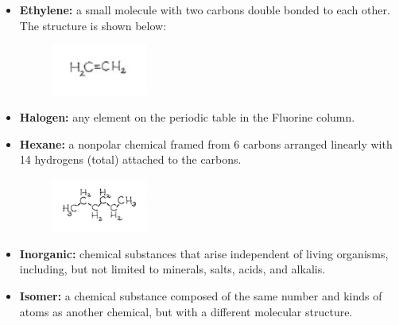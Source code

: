 \documentclass[11pt]{memoir}
\begin{document}
\begin{itemize}
\item[]{\textbf{Ethylene:} a small molecule with two carbons double bonded to each other.  The structure is shown below:}

\begin{figure}[h]
\vspace{-15pt}
\begin{center}
\includegraphics[width=0.3\textwidth]{images/lewis_notefig6a.png}
\end{center}
\vspace{-30pt}
\end{figure}


\item[]{\textbf{Halogen:} any element on the periodic table in the Fluorine column.}


\item[]{\textbf{Hexane:} a nonpolar chemical framed from 6 carbons arranged linearly with 14 hydrogens (total) attached to the carbons.}

\begin{figure}[h]
\vspace{-10pt}
\begin{center}
\includegraphics[width=0.3\textwidth]{images/lewis_notefig7.png}
\end{center}
\vspace{-30pt}
\end{figure}


\item[]{\textbf{Inorganic:} chemical substances that arise independent of living organisms, including, but not limited to minerals, salts, acids, and alkalis.}

\item[]{\textbf{Isomer:} a chemical substance composed of the same number and kinds of atoms as another chemical, but with a different molecular structure.}


\end{itemize}
\end{document}
